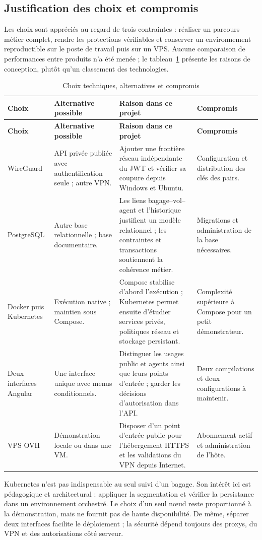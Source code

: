 \documentclass[11pt]{extarticle}
\begin{document}
\subsection{Justification des choix et compromis}
Les choix sont appréciés au regard de trois contraintes : réaliser un parcours métier complet, rendre les protections vérifiables et conserver un environnement reproductible sur le poste de travail puis sur un VPS. Aucune comparaison de performances entre produits n'a été menée ; le tableau~\ref{tab:choix} présente les raisons de conception, plutôt qu'un classement des technologies.
{
\begin{longtable}{p{2.5cm}p{3.3cm}p{4.9cm}p{2.7cm}}
\caption{Choix techniques, alternatives et compromis}\label{tab:choix}\\\toprule
\textbf{Choix} & \textbf{Alternative possible} & \textbf{Raison dans ce projet} & \textbf{Compromis}\\\midrule\endfirsthead
\toprule\textbf{Choix} & \textbf{Alternative possible} & \textbf{Raison dans ce projet} & \textbf{Compromis}\\\midrule\endhead
WireGuard & API privée publiée avec authentification seule ; autre VPN. & Ajouter une frontière réseau indépendante du JWT et vérifier sa coupure depuis Windows et Ubuntu. & Configuration et distribution des clés des pairs.\\
PostgreSQL & Autre base relationnelle ; base documentaire. & Les liens bagage--vol--agent et l'historique justifient un modèle relationnel ; les contraintes et transactions soutiennent la cohérence métier. & Migrations et administration de la base nécessaires.\\
Docker puis Kubernetes & Exécution native ; maintien sous Compose. & Compose stabilise d'abord l'exécution ; Kubernetes permet ensuite d'étudier services privés, politiques réseau et stockage persistant. & Complexité supérieure à Compose pour un petit démonstrateur.\\
Deux interfaces Angular & Une interface unique avec menus conditionnels. & Distinguer les usages public et agents ainsi que leurs points d'entrée ; garder les décisions d'autorisation dans l'API. & Deux compilations et deux configurations à maintenir.\\
VPS OVH & Démonstration locale ou dans une VM. & Disposer d'un point d'entrée public pour l'hébergement HTTPS et les validations du VPN depuis Internet. & Abonnement actif et administration de l'hôte.\\\bottomrule
\end{longtable}}
Kubernetes n'est pas indispensable au seul suivi d'un bagage. Son intérêt ici est pédagogique et architectural : appliquer la segmentation et vérifier la persistance dans un environnement orchestré. Le choix d'un seul nœud reste proportionné à la démonstration, mais ne fournit pas de haute disponibilité. De même, séparer deux interfaces facilite le déploiement ; la sécurité dépend toujours des proxys, du VPN et des autorisations côté serveur.
\end{document}
